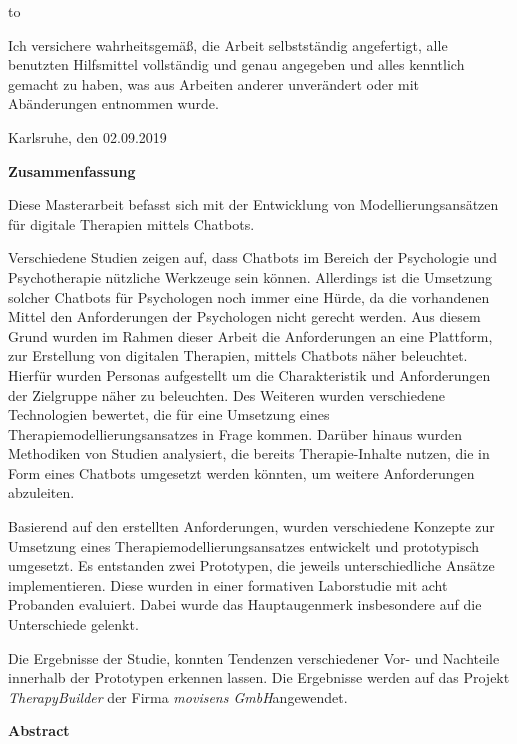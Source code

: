 \thispagestyle{empty}
\vspace*{42\baselineskip}
\hbox to \textwidth{\hrulefill}
\par
Ich versichere wahrheitsgemäß, die Arbeit selbstständig angefertigt, alle benutzten Hilfsmittel vollständig und genau angegeben und alles kenntlich gemacht zu haben, was aus Arbeiten anderer unverändert oder mit Abänderungen entnommen wurde.

Karlsruhe, den 02.09.2019

\cleardoublepage

\vspace*{1em}
\begin{center}
	\textbf{Zusammenfassung}
\end{center}
\par
Diese Masterarbeit befasst sich mit der Entwicklung von Modellierungsansätzen für digitale Therapien mittels Chatbots. 

Verschiedene Studien zeigen auf, dass Chatbots im Bereich der Psychologie und Psychotherapie nützliche Werkzeuge sein können. Allerdings ist die Umsetzung solcher Chatbots für Psychologen noch immer eine Hürde, da die vorhandenen Mittel den Anforderungen der Psychologen nicht gerecht werden. 
Aus diesem Grund wurden im Rahmen dieser Arbeit die Anforderungen an eine Plattform, zur Erstellung von digitalen Therapien, mittels Chatbots näher beleuchtet. Hierfür wurden Personas aufgestellt um die Charakteristik und Anforderungen der Zielgruppe näher zu beleuchten. Des Weiteren wurden verschiedene Technologien bewertet, die für eine Umsetzung eines Therapiemodellierungsansatzes in Frage kommen. Darüber hinaus wurden Methodiken von Studien analysiert, die bereits Therapie-Inhalte nutzen, die in Form eines Chatbots umgesetzt werden könnten, um weitere Anforderungen abzuleiten.

Basierend auf den erstellten Anforderungen, wurden verschiedene Konzepte zur Umsetzung eines Therapiemodellierungsansatzes entwickelt und prototypisch umgesetzt. Es entstanden zwei Prototypen, die jeweils unterschiedliche Ansätze implementieren. Diese wurden in einer formativen Laborstudie mit acht Probanden evaluiert. Dabei wurde das Hauptaugenmerk insbesondere auf die Unterschiede gelenkt. 

Die Ergebnisse der Studie, konnten Tendenzen verschiedener Vor- und Nachteile innerhalb der Prototypen erkennen lassen. Die Ergebnisse werden auf das Projekt \emph{TherapyBuilder} der Firma \emph{movisens GmbH}angewendet.

\cleardoublepage
\vspace*{1em}
\begin{center}
	\textbf{Abstract}
\end{center}
\par

